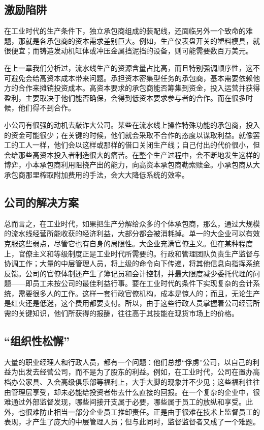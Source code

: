 \subsection{激励陷阱}
在工业时代的生产条件下，独立承包商组成的装配线，还面临另外一个致命的难题，那就是各承包商的资本需求差别巨大。例如，生产仪表盘开关的塑料模具，就很便宜；而铸造发动机缸体或冲压金属挡泥挡的设备，则可能需要数百万美元。

在上一章我们分析过，流水线生产的资源含量占比高，而且特别强调顺序性，这不可避免会给高资本成本带来问题。承担资本密集型任务的承包商，基本需要依赖他方的合作来摊销投资成本。高资本要求的承包商能否筹集到资金，投入运营并获得盈利，主要取决于他们能否确保，会得到低资本要求参与者的合作。而在很多时候，他们得不到合作。

小公司有很强的动机去敲诈大公司。某些在流水线上操作特殊功能的承包商，投入的资金可能很少；在关键的时候，他们就会采取不合作的态度以谋取利益。就像罢工的工人一样，他们会以这样或那样的借口关闭生产线；自己付出的代价很小，但会给那些高资本投入者制造很大的痛苦。在整个生产过程中，会不断地发生这样的博弈，小本承包商利用阻挠产出的能力，向高资本承包商勒索赎金。小承包商从大承包商那里榨取附加费用的手法，会大大降低系统的效率。

\subsection{公司的解决方案}
总而言之，在工业时代，如果把生产分解给众多的个体承包商，那么，通过大规模的流水线经营所能收获的经济利益，大部分都会被消耗掉。单一的大企业可以有效克服这些弱点，尽管它也有自身的局限性。大企业充满官僚主义。但在某种程度上，官僚主义和等级制度正是工业时代所需要的。行政和管理团队负责生产监督与协调工作；大量的中层管理人员，将上级的命令向下传递，将其他信息向指挥系统反馈。公司的官僚体制还产生了簿记员和会计控制，并最大限度减少委托代理的问题——即员工未按公司的最佳利益行事。要在工业时代的条件下实现复杂的会计系统，需要很多人的工作。这样一套行政官僚机构，成本是惊人的；而且，无论生产是红火还是低迷，这个费用都要支付。所以，由于这些行政人员掌握着公司经营所需的关键知识，他们所获得的报酬，往往高于其技能在现货市场上的价格。

\subsection{“组织性松懈”}
大量的职业经理人和行政人员，都有一个问题：他们总想“俘虏”公司，以自己的利益为出发去经营公司，而不是为了股东的利益。例如，在工业时代，公司在置办高档办公家具、入会高级俱乐部等福利上，大手大脚的现象并不少见；这些福利往往由管理层享受，却未必能给投资者带去什么直接的回报。在一个复杂的企业中，很难通过外部监督发现，哪些间接开支属于必要，哪些属于员工的放纵和享受。此外，也很难防止相当一部分企业员工推卸责任。正是由于很难在技术上监督员工的表现，才产生了庞大的中层管理人员；但与此同时，监督监督者又成了一个难题。

